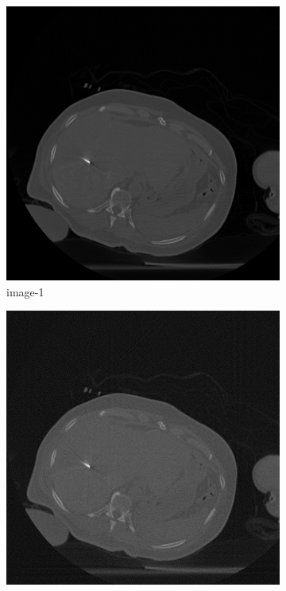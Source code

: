 \documentclass[journal]{IEEEtran}
\begin{document}
\begin{figure}[!h]
       \begin{subfigure}[b]{0.24\linewidth}
        \includegraphics[width=\textwidth]{../images/tmh/RFA2/template1.png}
\captionsetup{labelformat=empty}       
 \caption{image-1}
    \end{subfigure}
       \begin{subfigure}[b]{0.24\linewidth}
        \includegraphics[width=\textwidth]{../images/tmh/RFA2/new_protocol/result_image_1.png}

\end{subfigure}
\end{figure}
\end{document}
